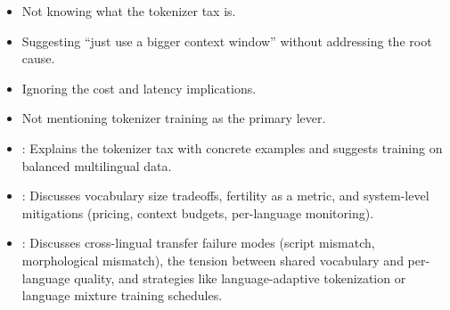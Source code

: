 \begin{interviewq}
\redflags
\begin{itemize}
    \item Not knowing what the tokenizer tax is.
    \item Suggesting ``just use a bigger context window'' without addressing the root cause.
    \item Ignoring the cost and latency implications.
    \item Not mentioning tokenizer training as the primary lever.
\end{itemize}


\goodgreat
\begin{itemize}
    \item {}: Explains the tokenizer tax with concrete examples and
          suggests training on balanced multilingual data.
    \item {}: Discusses vocabulary size tradeoffs, fertility as a metric,
          and system-level mitigations (pricing, context budgets, per-language monitoring).
    \item {}: Discusses cross-lingual transfer failure modes (script
          mismatch, morphological mismatch), the tension between shared vocabulary
          and per-language quality, and strategies like language-adaptive tokenization
          or language mixture training schedules.
\end{itemize}

\end{interviewq}

\vspace{0.5em}

